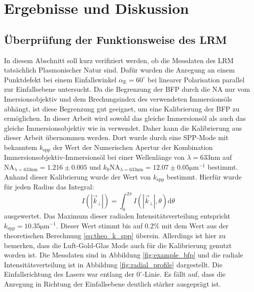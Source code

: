 \documentclass[titlepage]{article}
\begin{document}
\section{Ergebnisse und Diskussion}
	\subsection{Überprüfung der Funktionsweise des LRM}
		In diesem Abschnitt soll kurz verifiziert werden, ob die Messdaten des LRM tatsächlich Plasmonischer Natur sind. Dafür wurden die Anregung an einem Punktdefekt bei einem Einfallswinkel $\alpha_{\mathrm{E}} = 60^\circ$ bei linearer Polarisation parallel zur Einfallsebene untersucht. Da die Begrenzung der BFP durch die NA nur vom Imersionsobjektiv und dem Brechungsindex des verwendeten Immersionsöls abhängt, ist diese Begrenzung gut geeignet, um eine Kalibrierung der BFP zu ermöglichen. In dieser Arbeit wird sowohl das gleiche Immersionsöl als auch das gleiche Immersionsobjektiv wie in\cite{Jaruschewski.2020} verwendet. Daher kann die Kalibrierung aus dieser Arbeit übernommen werden. Dort wurde durch eine SPP-Mode mit bekanntem $k_{\mathrm{spp}}$ der Wert der Numerischen Apertur der Kombination Immersionsobjektiv-Immersionsöl bei einer Wellenlänge von $\lambda=633\mathrm{nm}$ auf $\mathrm{NA}_{\lambda = 633 \mathrm{nm}} = 1.216 \pm 0.005$  und $k_0\mathrm{NA}_{\lambda = 633 \mathrm{nm}} = 12.07 \pm 0.05\mathrm{\mu m}^{-1}$ bestimmt. Anhand dieser Kalibrierung wurde der Wert von $k_{\mathrm{spp}}$ bestimmt. Hierfür wurde für jeden Radius das Integral:
		$$ I\left(|\vec{k}_{\bot}|\right) = \int_{0}^{2 \pi} I\left(|\vec{k}_{\bot}|, \theta\right)\mathrm{d}\theta$$
		ausgewertet. Das Maximum dieser radialen Intensitätsverteilung entspricht $k_{\mathrm{spp}} = 10.35\mathrm{\mu m}^{-1}$.
		 Dieser Wert stimmt bis auf $0.2\%$ mit dem Wert aus der theoretischen Berechnung \eqref{eq:theo_k_spp} überein. Allerdings ist hier zu bemerken, dass die Luft-Gold-Glas Mode auch für die Kalibrierung genutzt worden ist. Die Messdaten sind in Abbildung \ref{fig:example_bfp} und die radiale Intensitätsverteilung ist in Abbildung \ref{fig:radial_profile} dargestellt. Die Einfallsrichtung des Lasers war entlang der $0^\circ$-Linie. Es fällt auf, dass die Anregung in Richtung der Einfallsebene deutlich stärker ausgeprägt ist. 
\end{document}
